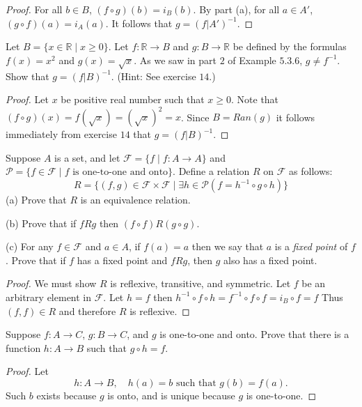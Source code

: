 \begin{proof}
    For all $b \in B$, $(f \circ g)(b) = i_B(b)$.
    By part (a), for all $a \in A'$, $(g \circ f)(a) = i_A(a)$.
    It follows that $g = (f | A')^{-1}$.
\end{proof}

\begin{tcolorbox}[title=Problem 15, breakable]
    Let $B = \{x \in \mathbb{R} \mid x \ge 0\}$.
    Let $f : \mathbb{R} \rightarrow B$ and $g : B \rightarrow \mathbb{R}$
    be defined by the formulas $f(x) = x^2$ and $g(x) = \sqrt{x}$.
    As we saw in part $2$ of Example $5.3.6$, $g \ne f^{-1}$.
    Show that $g = (f | B)^{-1}$.
    (Hint: See exercise $14$.)
\end{tcolorbox}

\begin{proof}
    Let $x$ be positive real number such  that $x \ge 0$.
    Note that $(f \circ g)(x) = f(\sqrt{x}) = (\sqrt{x})^2 = x$.
    Since $B = Ran(g)$ it follows immediately from exercise $14$
        that $g = (f | B)^{-1}$.
\end{proof}

\begin{tcolorbox}[title=Problem 17, breakable]
    Suppose $A$ is a set, and let $\mathcal{F} = \{f \mid f : A \rightarrow A\}$
    and $\mathcal{P} = \{f \in \mathcal{F} \mid f \text{ is one-to-one and onto}\}$.
    Define a relation $R$ on $\mathcal{F}$ as follows:
    \[R = \{(f, g) \in \mathcal{F} \times \mathcal{F} \mid \exists{h} \in \mathcal{P}(f = h^{-1} \circ g \circ h)\}\]
    (a) Prove that $R$ is an equivalence relation.

    (b) Prove that if $f R g$ then $(f \circ f) R (g \circ g)$.

    (c) For any $f \in \mathcal{F}$ and $a \in A$, if $f(a) = a$ then we say that $a$
        is a \emph{fixed point} of $f$. Prove that if $f$ has a fixed point and $f R g$,
        then $g$ also has a fixed point.
\end{tcolorbox}

\begin{proof}
    We must show $R$ is reflexive, transitive, 
        and symmetric.
    Let $f$ be an arbitrary element in $\mathcal{F}$.
    Let $h = f$ then $h^{-1} \circ f \circ h = f^{-1} \circ f \circ f = i_B \circ f = f$
    Thus $(f, f) \in R$ and therefore $R$ is reflexive.
\end{proof}

\begin{tcolorbox}[title=Problem 18, breakable]
    Suppose $f : A \rightarrow C$, $g : B \rightarrow C$, and $g$ is one-to-one and onto.
    Prove that there is a function $h : A \rightarrow B$ such that $g \circ h = f$.
\end{tcolorbox}

\begin{proof}
    Let 
    \[
        h : A \rightarrow B, \quad h(a) = b \text{ such that } g(b) = f(a).
    \]
    Such $b$ exists because $g$ is onto, and is unique because $g$ is one-to-one.
\end{proof}